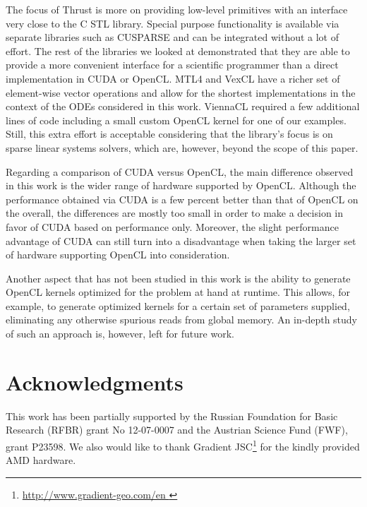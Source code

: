 \documentclass[final]{siamltex}
\newcommand{\addpp}[1]{{#1\nolinebreak[4]\hspace{-.05em}\raisebox{.4ex}{\tiny\bf ++}}\xspace}
\newcommand{\Cpp}{\addpp{C}}
\begin{document}
The focus of Thrust is more on providing low-level primitives with an
interface very close to the \Cpp STL library.  Special purpose
functionality is available via separate libraries such as CUSPARSE and
can be integrated without a lot of effort.  The rest of the libraries
we looked at demonstrated that they are able to provide a more
convenient interface for a scientific programmer than a direct
implementation in CUDA or OpenCL.  MTL4 and VexCL have a richer set of
element-wise vector operations and allow for the shortest
implementations in the context of the ODEs considered in this work.
ViennaCL required a few additional lines of code including a small
custom OpenCL kernel for one of our examples.  Still, this extra
effort is acceptable considering that the library's focus is on sparse
linear systems solvers, which are, however, beyond the scope of this
paper.

Regarding a comparison of CUDA versus OpenCL, the main difference observed in
this work is the wider range of hardware supported by OpenCL.  Although the performance
obtained via CUDA is a few percent better than that of OpenCL on the overall,
the differences are mostly too small in order to make a decision in favor of
CUDA based on performance only.  Moreover, the slight performance advantage of
CUDA can still turn into a disadvantage when taking the larger set of hardware
supporting OpenCL into consideration.


Another aspect that has not been studied in this work is the ability to
generate OpenCL kernels optimized for the problem at hand at runtime. This
allows, for example, to generate optimized kernels for a certain set of
parameters supplied, eliminating any otherwise spurious reads from global
memory.  An in-depth study of such an approach is, however, left for future
work.

\section{Acknowledgments}

This work has been partially supported by the Russian Foundation for Basic
Research (RFBR) grant No 12-07-0007 and the Austrian Science Fund (FWF), grant
P23598.  We also would like to thank Gradient JSC\footnote{ \href{
http://www.gradient-geo.com/en }{ http://www.gradient-geo.com/en } } for the
kindly provided AMD hardware.




\end{document}
